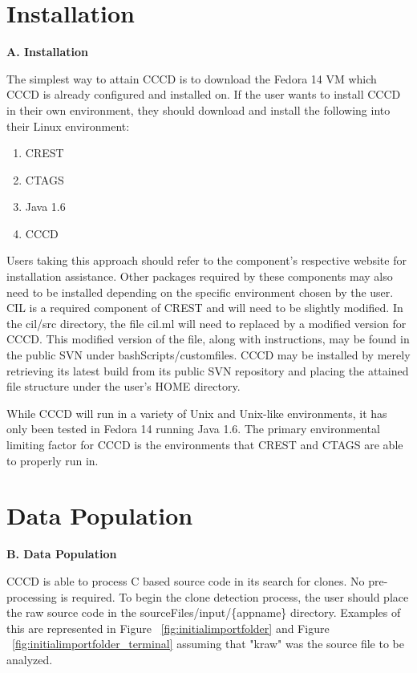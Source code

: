 \documentclass[conference]{IEEEtran}
\begin{document}
\section{Installation}
{\bf A. Installation} %

The simplest way to attain CCCD is to download the Fedora 14 VM which CCCD is already configured and installed on. If the user wants to install CCCD in their own environment, they should download and install the following into their Linux environment:

\begin{enumerate}
 \item CREST
  \item CTAGS
 \item Java 1.6
  \item CCCD
\end{enumerate}

Users taking this approach should refer to the component's respective website for installation assistance. Other packages required by these components may also need to be installed depending on the specific environment chosen by the user. CIL is a required component of CREST and will need to be slightly modified. In the cil/src directory, the file cil.ml will need to replaced by a modified version for CCCD. This modified version of the file, along with instructions, may be found in the public SVN under bashScripts/customfiles. CCCD may be installed by merely retrieving its latest build from its public SVN repository and placing the attained file structure under the user's HOME directory.

While CCCD will run in a variety of Unix and Unix-like environments, it has only been tested in Fedora 14 running Java 1.6. The primary environmental limiting factor for CCCD is the environments that CREST and CTAGS are able to properly run in. \\


\section{Data Population}
{\bf B. Data Population} %

CCCD is able to process C based source code in its search for clones. No pre-processing is required. To begin the clone detection process, the user should place the raw source code in the sourceFiles/input/\{appname\} directory. Examples of this are represented in Figure ~\ref{fig:initialimportfolder} and Figure ~\ref{fig:initialimportfolder_terminal} assuming that "kraw" was the source file to be analyzed.
\end{document}
